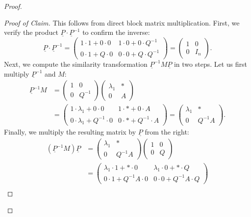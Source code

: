\begin{proof}
  \begin{proof}[Proof of Claim]
    This follows from direct block matrix multiplication. First, we verify the product $\underline{P} \cdot \underline{P}^{-1}$ to confirm the inverse:
    \[ \underline{P} \cdot \underline{P}^{-1} = \left(\begin{array}{c|c} 1 \cdot 1 + 0 \cdot 0 & 1 \cdot 0 + 0 \cdot Q^{-1} \\ \hline 0 \cdot 1 + Q \cdot 0 & 0 \cdot 0 + Q \cdot Q^{-1} \end{array}\right) = \left(\begin{array}{c|c} 1 & 0 \\ \hline 0 & I_n \end{array}\right). \]
    Next, we compute the similarity transformation $\underline{P}^{-1} M \underline{P}$ in two steps. Let us first multiply $\underline{P}^{-1}$ and $M$:
    \begin{align*}
      \underline{P}^{-1} M &= \left(\begin{array}{c|c} 1 & 0 \\ \hline 0 & Q^{-1} \end{array}\right) \left(\begin{array}{c|c} \lambda_1 & * \\ \hline 0 & A \end{array}\right) \\
      &= \left(\begin{array}{c|c} 1 \cdot \lambda_1 + 0 \cdot 0 & 1 \cdot * + 0 \cdot A \\ \hline 0 \cdot \lambda_1 + Q^{-1} \cdot 0 & 0 \cdot * + Q^{-1} \cdot A \end{array}\right) = \left(\begin{array}{c|c} \lambda_1 & * \\ \hline 0 & Q^{-1}A \end{array}\right).
    \end{align*}
    Finally, we multiply the resulting matrix by $\underline{P}$ from the right:
    \begin{align*}
      (\underline{P}^{-1} M) \underline{P} &= \left(\begin{array}{c|c} \lambda_1 & * \\ \hline 0 & Q^{-1}A \end{array}\right) \left(\begin{array}{c|c} 1 & 0 \\ \hline 0 & Q \end{array}\right) \\
      &= \left(\begin{array}{c|c} \lambda_1 \cdot 1 + * \cdot 0 & \lambda_1 \cdot 0 + * \cdot Q \\ \hline 0 \cdot 1 + Q^{-1}A \cdot 0 & 0 \cdot 0 + Q^{-1}A \cdot Q \end{array}\right) \\

\end{align*}
\end{proof}
\end{proof}
